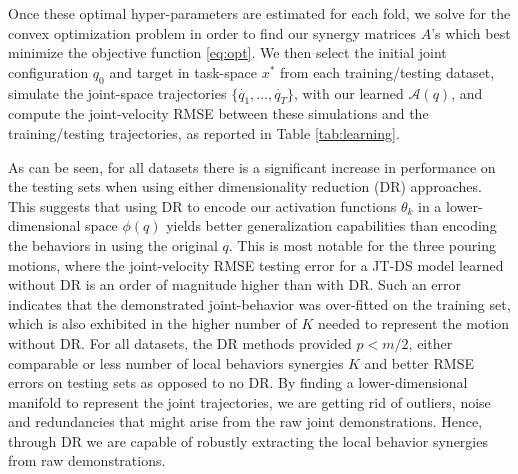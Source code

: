 \documentclass[letterpaper, 10 pt, conference,fleqn]{ieeeconf}
\begin{document}
Once these optimal hyper-parameters are estimated for each fold, we solve for the convex optimization problem in order to find our synergy matrices $A$'s which best minimize the objective function \eqref{eq:opt}. We then select the initial joint configuration $q_0$ and target in task-space $x^*$ from each training/testing dataset, simulate the joint-space trajectories $\{\dot{q_1},\dots,\dot{q_T}\}$, with our learned $\mathcal{A}(q)$, and compute the joint-velocity RMSE between these simulations and the training/testing trajectories, as reported in Table \ref{tab:learning}.

As can be seen, for all datasets there is a significant increase in performance on the testing sets when using either dimensionality reduction (DR) approaches. This suggests that using DR to encode our activation functions $\theta_k$ in a lower-dimensional space $\phi(q)$ yields better generalization capabilities than encoding the behaviors in using the original $q$. This is most notable for the three pouring motions, where the joint-velocity RMSE testing error for a JT-DS model learned without DR is an order of magnitude higher than with DR. Such an error indicates that the demonstrated joint-behavior was over-fitted on the training set, which is also exhibited in the higher number of $K$ needed to represent the motion without DR. For all datasets, the DR methods provided $p < m/2$, either comparable or less number of local behaviors synergies $K$ and better RMSE errors on testing sets as opposed to no DR. By finding a lower-dimensional manifold to represent the joint trajectories, we are getting rid of outliers, noise and redundancies that might arise from the raw joint demonstrations. Hence, through DR we are capable of robustly extracting the local behavior synergies from raw demonstrations. 
\end{document}
